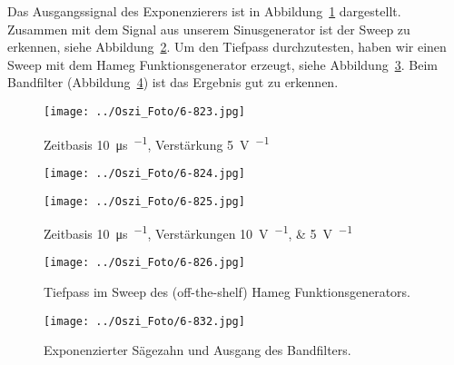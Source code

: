 Das Ausgangssignal des Exponenzierers ist in Abbildung~\ref{fig:823}
dargestellt. Zusammen mit dem Signal aus unserem Sinusgenerator ist der Sweep
zu erkennen, siehe Abbildung~\ref{fig:824}. Um den Tiefpass durchzutesten,
haben wir einen Sweep mit dem Hameg Funktionsgenerator erzeugt, siehe
Abbildung~\ref{fig:826}. Beim Bandfilter (Abbildung~\ref{fig:832}) ist das
Ergebnis gut zu erkennen.

\begin{figure}[htbp]
	\centering
	\texttt{[image: ../Oszi\_Foto/6-823.jpg]}
	\caption{%
		Zeitbasis \SI{10}{\micro\second\per\division},
		Verstärkung \SI{5}{\volt\per\division}
	}
	\label{fig:823}
\end{figure}

\begin{figure}[htbp]
	\centering
	\begin{minipage}{.45\linewidth}
		\texttt{[image: ../Oszi\_Foto/6-824.jpg]}
	\end{minipage}
	\hfill
	\begin{minipage}{.45\linewidth}
		\texttt{[image: ../Oszi\_Foto/6-825.jpg]}
	\end{minipage}
	\caption{%
		Zeitbasis \SI{10}{\micro\second\per\division},
		Verstärkungen \SIlist{10;5}{\volt\per\division}
	}
	\label{fig:824}
\end{figure}

\begin{figure}[htbp]
	\centering
	\texttt{[image: ../Oszi\_Foto/6-826.jpg]}
	\caption{%
		Tiefpass im Sweep des (off-the-shelf) Hameg Funktionsgenerators.
	}
	\label{fig:826}
\end{figure}

\begin{figure}[htbp]
	\centering
	\texttt{[image: ../Oszi\_Foto/6-832.jpg]}
	\caption{%
		Exponenzierter Sägezahn und Ausgang des Bandfilters.
	}
	\label{fig:832}
\end{figure}


\FloatBarrier
\IfFileExists{\bibliographyfile}{
	
}{}



